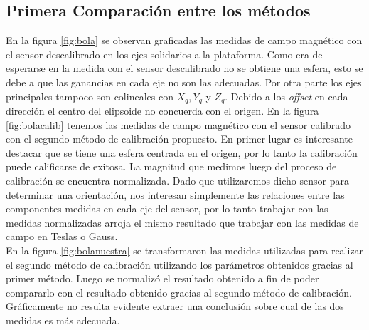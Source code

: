 \documentclass[spanish,12pt,a4paper,titlepage]{report}
\begin{document}
\subsection{Primera Comparación entre los métodos}
En la figura \ref{fig:bola} se observan graficadas las medidas de campo magnético con el sensor descalibrado en los ejes solidarios a la plataforma. Como era de esperarse en la medida con el sensor descalibrado no se obtiene una esfera, esto se debe a que las ganancias en cada eje no son las adecuadas. Por otra parte los ejes principales tampoco son colineales con $X_q, Y_q $ y $ Z_q$. Debido a los \emph{offset} en cada dirección el centro del elipsoide no concuerda con el origen. En la figura \ref{fig:bolacalib} tenemos las medidas de campo magnético con el sensor calibrado con el segundo método de calibración propuesto. En primer lugar es interesante destacar que se tiene una esfera centrada en el origen, por lo tanto la calibración puede calificarse de exitosa. La magnitud que medimos luego del proceso de calibración se encuentra normalizada. Dado que utilizaremos dicho sensor para determinar una orientación, nos interesan simplemente las relaciones entre las componentes medidas en cada eje del sensor, por lo tanto trabajar con las medidas normalizadas arroja el mismo resultado que trabajar con las medidas de campo en Teslas o Gauss.\\

En la figura \ref{fig:bolanuestra} se transformaron las medidas utilizadas para realizar el segundo método de calibración utilizando los parámetros obtenidos gracias al primer método. Luego se normalizó el resultado obtenido a fin de poder compararlo con el resultado obtenido gracias al segundo método de calibración. Gráficamente no resulta evidente extraer una conclusión sobre cual de las dos medidas es más adecuada. 
\end{document}
